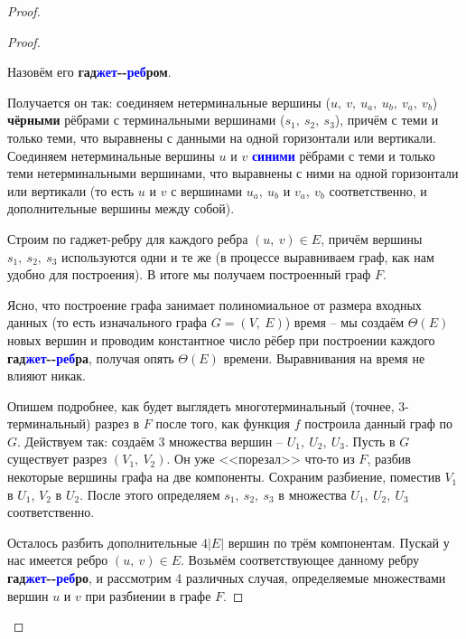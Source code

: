 \documentclass[a4paper,12pt]{article}
\begin{document}
\begin{proof}
\begin{proof}
\begin{center}
\begin{tikzpicture}
        \end{tikzpicture}
        \end{center}
        
        
        Назовём его \textbf{гад}\textbf{\textcolor{blue}{жет}}\textbf{-}\textbf{-}\textbf{\textcolor{blue}{реб}}\textbf{ром}.
        
        Получается он так: соединяем нетерминальные  вершины ($u,\ v,\ u_a,\ u_b,\ v_a,\ v_b$) \textbf{чёрными} рёбрами с терминальными вершинами ($s_1,\ s_2,\ s_3$), причём с теми и только теми, что выравнены с данными на одной горизонтали или вертикали. Соединяем нетерминальные вершины $u$ и $v$ \textbf{\textcolor{blue}{синими}} рёбрами с теми и только теми нетерминальными вершинами, что выравнены с ними на одной горизонтали или вертикали (то есть $u$ и $v$ с вершинами $u_a,\ u_b$ и $v_a,\ v_b$ соответственно, и дополнительные вершины между собой).
        
        Строим по гаджет-ребру для каждого ребра  $(u,\ v) \in E$, причём вершины $s_1,\ s_2,\ s_3$ используются одни и те же (в процессе выравниваем граф, как нам удобно для построения). В итоге мы получаем построенный граф $F$.
        
        Ясно, что построение графа занимает полиномиальное от размера входных данных (то есть изначального графа $G = (V,\ E)$) время -- мы создаём $\Theta(E)$ новых вершин и проводим константное число рёбер при построении каждого \textbf{гад}\textbf{\textcolor{blue}{жет}}\textbf{-}\textbf{-}\textbf{\textcolor{blue}{реб}}\textbf{ра}, получая опять $\Theta(E)$ времени. Выравнивания на время не влияют никак.
        
        Опишем подробнее, как будет выглядеть многотерминальный (точнее, 3-терминальный) разрез в $F$ после того, как функция $f$ построила данный граф по $G$. Действуем так: создаём 3 множества вершин --  $U_1,\ U_2,\ U_3$. Пусть в $G$ существует разрез $(V_1,\ V_2)$. Он уже <<порезал>> что-то из $F$, разбив некоторые вершины графа на две компоненты. Сохраним разбиение, поместив $V_1$ в $U_1$, $V_2$ в $U_2$. После этого определяем $s_1,\ s_2,\ s_3$ в множества $U_1,\ U_2,\ U_3$ соответственно.
        
        Осталось разбить дополнительные $4|E|$ вершин по трём компонентам. Пускай у нас имеется ребро $(u,\ v) \in E$. Возьмём соответствующее данному ребру \textbf{гад}\textbf{\textcolor{blue}{жет}}\textbf{-}\textbf{-}\textbf{\textcolor{blue}{реб}}\textbf{ро}, и рассмотрим 4 различных случая, определяемые множествами вершин $u$ и $v$ при разбиении в графе $F$. 
        

\end{proof}
\end{proof}
\end{document}
